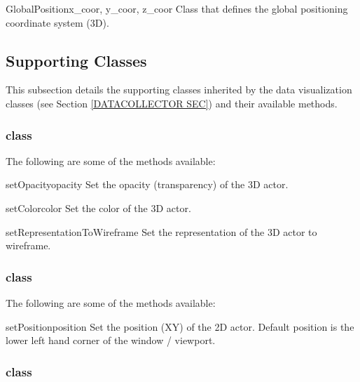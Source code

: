 \begin{classdesc}{GlobalPosition}{x_coor, y_coor, z_coor}
Class that defines the global positioning coordinate system (3D).
\end{classdesc}




\subsection{Supporting Classes}
This subsection details the supporting classes inherited by the data 
visualization classes (see Section \ref{DATACOLLECTOR SEC}) and their 
available methods. 

\subsubsection{\ActorThreeD class}

The following are some of the methods available:

\begin{methoddesc}[Actor3D]{setOpacity}{opacity}
Set the opacity (transparency) of the 3D actor.
\end{methoddesc}

\begin{methoddesc}[Actor3D]{setColor}{color}
Set the color of the 3D actor.
\end{methoddesc}

\begin{methoddesc}[Actor3D]{setRepresentationToWireframe}{}
Set the representation of the 3D actor to wireframe.
\end{methoddesc}

\subsubsection{\ActorTwoD class}

The following are some of the methods available:

\begin{methoddesc}[Actor2D]{setPosition}{position}
Set the position (XY) of the 2D actor. Default position is the lower left hand
corner of the window / viewport.
\end{methoddesc}

\subsubsection{\Clipper class}

